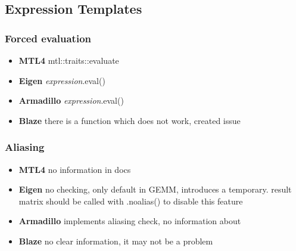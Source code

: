 \documentclass{article}
\begin{document}
\FloatBarrier

\subsection{Expression Templates}

\subsubsection{Forced evaluation}
\begin{itemize}
\item \textbf{MTL4} mtl::traits::evaluate \\
\item \textbf{Eigen} \textit{expression}.eval() \\
\item \textbf{Armadillo} \textit{expression}.eval() \\
\item \textbf{Blaze} there is a function which does not work, created issue \\
\end{itemize}

\subsubsection{Aliasing}
\begin{itemize}
\item \textbf{MTL4} no information in docs \\
\item \textbf{Eigen} no checking, only default in GEMM, introduces a temporary. result matrix should be called with .noalias() to disable this feature\\ 
\item \textbf{Armadillo} implements aliasing check, no information about  \\
\item \textbf{Blaze} no clear information, it may not be a problem \\
\end{itemize}
\end{document}
